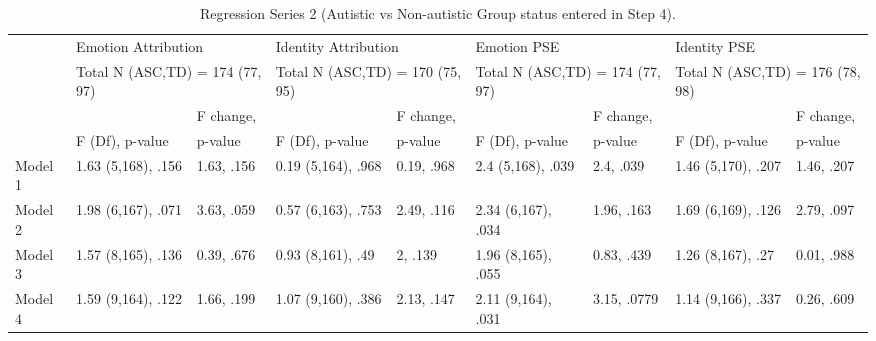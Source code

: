 \documentclass[
]{article}
\begin{document}
\begin{table}[H]

\caption{\label{tab:table5}Regression Series 2 (Autistic vs Non-autistic Group status entered in Step 4).}
\centering
\fontsize{5}{7}\selectfont
\begin{tabular}[t]{lllllllll}
\toprule
\multicolumn{1}{l}{} & \multicolumn{2}{l}{Emotion Attribution} & \multicolumn{2}{l}{Identity Attribution} & \multicolumn{2}{l}{Emotion PSE} & \multicolumn{2}{l}{Identity PSE} \\
\multicolumn{1}{l}{} & \multicolumn{2}{l}{Total N (ASC,TD) = 174 (77, 97)} & \multicolumn{2}{l}{Total N (ASC,TD) = 170 (75, 95)} & \multicolumn{2}{l}{Total N (ASC,TD) = 174 (77, 97)} & \multicolumn{2}{l}{Total N (ASC,TD) = 176 (78, 98)} \\
\cmidrule(l{3pt}r{3pt}){2-3} \cmidrule(l{3pt}r{3pt}){4-5} \cmidrule(l{3pt}r{3pt}){6-7} \cmidrule(l{3pt}r{3pt}){8-9}
 &  & F change, &  & F change, &  & F change, &  & F change,\\
 & F (Df), p-value & p-value & F (Df), p-value & p-value & F (Df), p-value & p-value & F (Df), p-value & p-value\\
\midrule
Model 1 & 1.63 (5,168), .156 & 1.63, .156 & 0.19 (5,164), .968 & 0.19, .968 & 2.4 (5,168), .039 & 2.4, .039 & 1.46 (5,170), .207 & 1.46, .207\\
Model 2 & 1.98 (6,167), .071 & 3.63, .059 & 0.57 (6,163), .753 & 2.49, .116 & 2.34 (6,167), .034 & 1.96, .163 & 1.69 (6,169), .126 & 2.79, .097\\
Model 3 & 1.57 (8,165), .136 & 0.39, .676 & 0.93 (8,161), .49 & 2, .139 & 1.96 (8,165), .055 & 0.83, .439 & 1.26 (8,167), .27 & 0.01, .988\\
\addlinespace
Model 4 & 1.59 (9,164), .122 & 1.66, .199 & 1.07 (9,160), .386 & 2.13, .147 & 2.11 (9,164), .031 & 3.15, .0779 & 1.14 (9,166), .337 & 0.26, .609\\
\bottomrule
\end{tabular}
\end{table}
\end{document}

